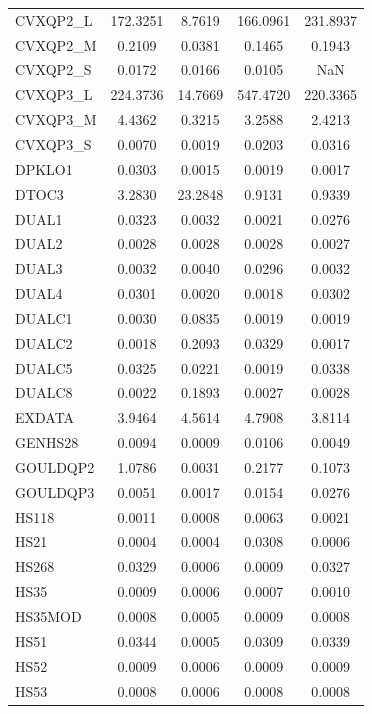 \begin{longtable}{lcccc}
CVXQP2\_L & 172.3251 &   8.7619 & 166.0961 & 231.8937 \\
CVXQP2\_M &   0.2109 &   0.0381 &   0.1465 &   0.1943 \\
CVXQP2\_S &   0.0172 &   0.0166 &   0.0105 &      NaN \\
CVXQP3\_L & 224.3736 &  14.7669 & 547.4720 & 220.3365 \\
CVXQP3\_M &   4.4362 &   0.3215 &   3.2588 &   2.4213 \\
CVXQP3\_S &   0.0070 &   0.0019 &   0.0203 &   0.0316 \\
DPKLO1   &   0.0303 &   0.0015 &   0.0019 &   0.0017 \\
DTOC3    &   3.2830 &  23.2848 &   0.9131 &   0.9339 \\
DUAL1    &   0.0323 &   0.0032 &   0.0021 &   0.0276 \\
DUAL2    &   0.0028 &   0.0028 &   0.0028 &   0.0027 \\
DUAL3    &   0.0032 &   0.0040 &   0.0296 &   0.0032 \\
DUAL4    &   0.0301 &   0.0020 &   0.0018 &   0.0302 \\
DUALC1   &   0.0030 &   0.0835 &   0.0019 &   0.0019 \\
DUALC2   &   0.0018 &   0.2093 &   0.0329 &   0.0017 \\
DUALC5   &   0.0325 &   0.0221 &   0.0019 &   0.0338 \\
DUALC8   &   0.0022 &   0.1893 &   0.0027 &   0.0028 \\
EXDATA   &   3.9464 &   4.5614 &   4.7908 &   3.8114 \\
GENHS28  &   0.0094 &   0.0009 &   0.0106 &   0.0049 \\
GOULDQP2 &   1.0786 &   0.0031 &   0.2177 &   0.1073 \\
GOULDQP3 &   0.0051 &   0.0017 &   0.0154 &   0.0276 \\
HS118    &   0.0011 &   0.0008 &   0.0063 &   0.0021 \\
HS21     &   0.0004 &   0.0004 &   0.0308 &   0.0006 \\
HS268    &   0.0329 &   0.0006 &   0.0009 &   0.0327 \\
HS35     &   0.0009 &   0.0006 &   0.0007 &   0.0010 \\
HS35MOD  &   0.0008 &   0.0005 &   0.0009 &   0.0008 \\
HS51     &   0.0344 &   0.0005 &   0.0309 &   0.0339 \\
HS52     &   0.0009 &   0.0006 &   0.0009 &   0.0009 \\
HS53     &   0.0008 &   0.0006 &   0.0008 &   0.0008 \\

\end{longtable}
